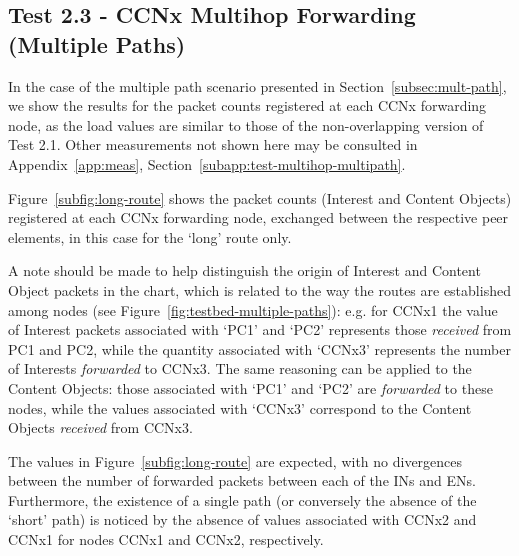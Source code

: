 \subsection{Test 2.3 - CCNx Multihop Forwarding (Multiple Paths)}
\label{subsec:test-multihop-multipath}

In the case of the multiple path scenario presented in 
Section~\ref{subsec:mult-path}, we show the results for the packet counts 
registered at each CCNx forwarding node, as the load values are similar to 
those of the non-overlapping version of Test 2.1. Other measurements not 
shown here may be consulted in Appendix~\ref{app:meas}, 
Section~\ref{subapp:test-multihop-multipath}.\vertbreak

Figure~\ref{subfig:long-route} shows the packet counts (Interest and 
Content Objects) registered at each CCNx forwarding node, exchanged 
between the respective peer elements, in this case for the `long' route 
only.\vertbreak 

A note should be 
made to help distinguish the origin of Interest and Content Object packets in the 
chart, which is related to the way the routes are established among 
nodes (see Figure~\ref{fig:testbed-multiple-paths}): e.g. for CCNx1 the value 
of Interest packets associated with `PC1' and `PC2' represents those 
\textit{received} from PC1 and PC2, while the quantity associated with `CCNx3' 
represents the number of Interests \textit{forwarded} to CCNx3. The same 
reasoning can be applied to the Content Objects: those associated with 
`PC1' and `PC2' are \textit{forwarded} to these nodes, while the values associated 
with `CCNx3' correspond to the Content Objects \textit{received} from CCNx3.\vertbreak

The values in Figure~\ref{subfig:long-route} are expected, with no 
divergences between the number of forwarded packets between each of the 
INs and ENs. Furthermore, the existence of a single path (or 
conversely the absence of the `short' path) is noticed by the 
absence of values associated with CCNx2 and CCNx1 for nodes CCNx1 and CCNx2, 
respectively.\vertbreak

